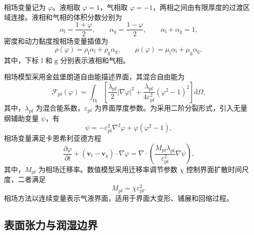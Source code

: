 相场变量记为 $\varphi$。液相取 $\varphi=1$，气相取 $\varphi=-1$，两相之间由有限厚度的过渡区域连接。液相和气相的体积分数分别为
\begin{equation}
\alpha_{\mathrm l}=\frac{1+\varphi}{2},
\qquad
\alpha_{\mathrm g}=\frac{1-\varphi}{2},
\qquad
\alpha_{\mathrm l}+\alpha_{\mathrm g}=1,
\label{eq:ch2_phase_fraction}
\end{equation}
密度和动力黏度按相场变量插值为
\begin{equation}
\rho(\varphi)
=
\rho_{\mathrm l}\alpha_{\mathrm l}
+
\rho_{\mathrm g}\alpha_{\mathrm g},
\qquad
\mu(\varphi)
=
\mu_{\mathrm l}\alpha_{\mathrm l}
+
\mu_{\mathrm g}\alpha_{\mathrm g},
\label{eq:ch2_phase_properties}
\end{equation}
其中，下标 $\mathrm l$ 和 $\mathrm g$ 分别表示液相和气相。

相场模型采用金兹堡朗道自由能描述界面，其混合自由能为
\begin{equation}
\mathcal{F}_{\mathrm{pf}}(\varphi)
=
\int_{\Omega_{\mathrm f}}
\left[
\frac{\lambda_{\mathrm{pf}}}{2}
\left|\nabla\varphi\right|^2
+
\frac{\lambda_{\mathrm{pf}}}{4\varepsilon_{\mathrm{pf}}^2}
\left(\varphi^2-1\right)^2
\right]
\mathrm d\Omega,
\label{eq:ch2_phase_free_energy}
\end{equation}
其中，$\lambda_{\mathrm{pf}}$ 为混合能系数，$\varepsilon_{\mathrm{pf}}$ 为界面厚度参数。为采用二阶分裂形式，引入无量纲辅助变量 $\psi$，有
\begin{equation}
\psi
=
-\varepsilon_{\mathrm{pf}}^2\nabla^2\varphi
+
\varphi\left(\varphi^2-1\right),
\label{eq:ch2_phase_auxiliary}
\end{equation}
相场变量满足卡恩希利亚德方程
\begin{equation}
\frac{\partial\varphi}{\partial t}
+
\left(\boldsymbol{v}_{\mathrm f}-\boldsymbol{v}_{\mathrm g}\right)
\cdot\nabla\varphi
=
\nabla\cdot
\left(
\frac{M_{\mathrm{pf}}\lambda_{\mathrm{pf}}}
{\varepsilon_{\mathrm{pf}}^2}
\nabla\psi
\right),
\label{eq:ch2_cahn_hilliard}
\end{equation}
其中，$M_{\mathrm{pf}}$ 为相场迁移率。数值模型采用迁移率调节参数 $\chi$ 控制界面扩散时间尺度，二者满足
\begin{equation}
M_{\mathrm{pf}}
=
\chi\varepsilon_{\mathrm{pf}}^2.
\label{eq:ch2_phase_mobility}
\end{equation}
相场方法以连续变量表示气液界面，适用于界面大变形、铺展和回缩过程\cite{anderson1998diffuseinterface,jacqmin1999phasefield,badalassi2003phasefield,yue2004diffuseinterface}。

\subsection{表面张力与润湿边界}

